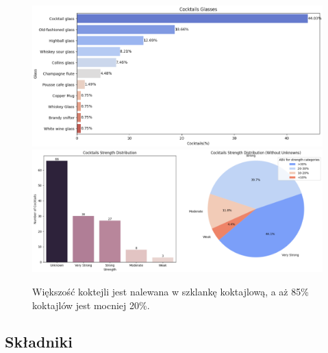 \documentclass{article}
\begin{document}
\begin{figure}[h]
\centering
    \includegraphics[width=1\linewidth]{c_p_3.png}
    \vspace{2cm}
    \includegraphics[width=1\linewidth]{c_p_8.png}
    \caption{Większość koktejli jest nalewana w szklankę koktajlową, a aż 85\% koktajlów jest mocniej 20\%.}
\end{figure}

\clearpage

\subsection{Składniki}
\end{document}

